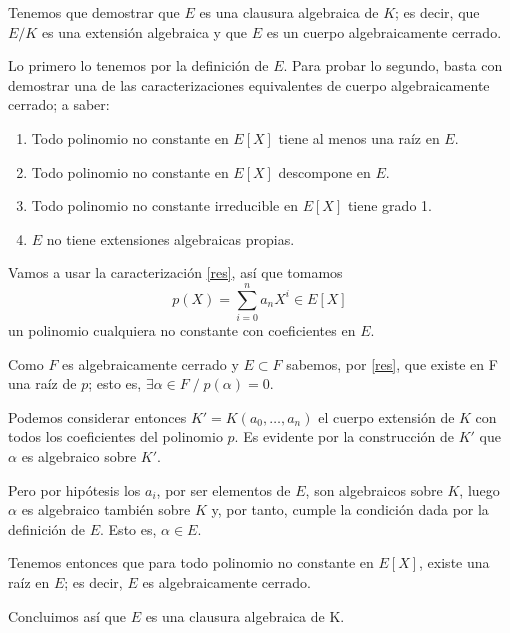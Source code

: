 \documentclass[a4paper, 11pt]{article}
\begin{document}
  \begin{solucion}
      Tenemos que demostrar que $E$ es una clausura algebraica de $K$; es decir, que $E/K$ es una extensión algebraica y que $E$ es un cuerpo algebraicamente cerrado.

      Lo primero lo tenemos por la definición de $E$. Para probar lo segundo, basta con demostrar una de las caracterizaciones equivalentes de cuerpo algebraicamente cerrado; a saber:
      \begin{enumerate}
          \item \label{res} Todo polinomio no constante en $E[X]$ tiene al menos una raíz en $E$.
          \item Todo polinomio no constante en $E[X]$ descompone en $E$.
          \item Todo polinomio no constante irreducible en $E[X]$ tiene grado 1.
          \item $E$ no tiene extensiones algebraicas propias.
      \end{enumerate}

      Vamos a usar la caracterización \ref{res}, así que tomamos
      \[
      p(X) = \sum_{i=0}^n a_n X^i \in E[X]
      \]
      un polinomio cualquiera no constante con coeficientes en $E$.

      Como $F$ es algebraicamente cerrado y $E\subset F$ sabemos, por \ref{res}, que existe en F una raíz de $p$; esto es, $\exists\alpha\in F \;/\; p(\alpha)=0$.

      Podemos considerar entonces $K'=K(a_0,\dots,a_n)$ el cuerpo extensión de $K$ con todos los coeficientes del polinomio $p$. Es evidente por la construcción de $K'$ que $\alpha$ es algebraico sobre $K'$.

      Pero por hipótesis los $a_i$, por ser elementos de $E$, son algebraicos sobre $K$, luego $\alpha$ es algebraico también sobre $K$ y, por tanto, cumple la condición dada por la definición de $E$. Esto es, $\alpha\in E$.

      Tenemos entonces que para todo polinomio no constante en $E[X]$, existe una raíz en $E$; es decir, $E$ es algebraicamente cerrado.

      Concluimos así que $E$ es una clausura algebraica de K.
  \end{solucion}
\end{document}

